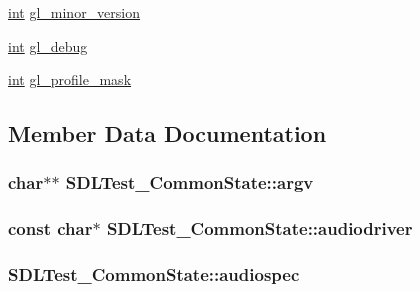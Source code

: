 \begin{DoxyCompactItemize}
\item 
\hyperlink{_s_d_l__thread_8h_a6a64f9be4433e4de6e2f2f548cf3c08e}{int} \hyperlink{struct_s_d_l_test___common_state_a5a50c65004454c791da21a3473388608}{gl\+\_\+minor\+\_\+version}
\item 
\hyperlink{_s_d_l__thread_8h_a6a64f9be4433e4de6e2f2f548cf3c08e}{int} \hyperlink{struct_s_d_l_test___common_state_a2710657ef2a0c8aabebc5fceb01c71b5}{gl\+\_\+debug}
\item 
\hyperlink{_s_d_l__thread_8h_a6a64f9be4433e4de6e2f2f548cf3c08e}{int} \hyperlink{struct_s_d_l_test___common_state_aa923ff5f227c35523a4e491863a7d907}{gl\+\_\+profile\+\_\+mask}
\end{DoxyCompactItemize}


\subsection{Member Data Documentation}
\subsubsection[{\texorpdfstring{argv}{argv}}]{\setlength{\rightskip}{0pt plus 5cm}char$\ast$$\ast$ S\+D\+L\+Test\+\_\+\+Common\+State\+::argv}\hypertarget{struct_s_d_l_test___common_state_a6db840410b86ab7c6807763fd8bcb081}{}\label{struct_s_d_l_test___common_state_a6db840410b86ab7c6807763fd8bcb081}
\subsubsection[{\texorpdfstring{audiodriver}{audiodriver}}]{\setlength{\rightskip}{0pt plus 5cm}const char$\ast$ S\+D\+L\+Test\+\_\+\+Common\+State\+::audiodriver}\hypertarget{struct_s_d_l_test___common_state_ae51671cdec7979ca844f19b650b75300}{}\label{struct_s_d_l_test___common_state_ae51671cdec7979ca844f19b650b75300}
\subsubsection[{\texorpdfstring{audiospec}{audiospec}}]{ S\+D\+L\+Test\+\_\+\+Common\+State\+::audiospec}\hypertarget{struct_s_d_l_test___common_state_a2f73162e6bfe149141192fa49717d805}{}\label{struct_s_d_l_test___common_state_a2f73162e6bfe149141192fa49717d805}
